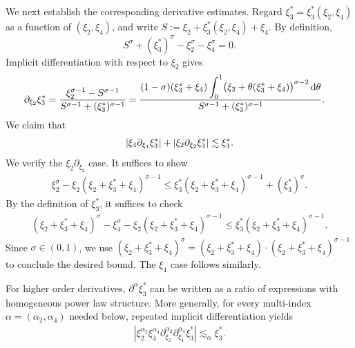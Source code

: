\documentclass[UTF-8,reqno]{amsart}
\numberwithin{equation}{section}
\theoremstyle{definition}
\def\dif{{\mathord{{\rm d}}}}
\def\leq{\leqslant}
\def\dif{{\mathord{{\rm d}}}}
\def\leq{\leqslant}
\begin{document}
We next establish the corresponding derivative estimates. Regard $ 
    \xi_3^*=\xi_3^*(\xi_2,\xi_4)$
as a function of $(\xi_2,\xi_4)$, and write
$
    S:=\xi_2+\xi_3^*(\xi_2,\xi_4)+\xi_4.
$
By definition,
\[
    S^\sigma+(\xi_3^*)^\sigma
    -\xi_2^\sigma-\xi_4^\sigma=0.
\]
Implicit differentiation with respect to $\xi_2$ gives
\begin{align}
\partial_{\xi_2}\xi_3^*
&=
\frac{
\xi_2^{\sigma-1}
-
S^{\sigma-1}
}{
S^{\sigma-1}
+
(\xi_3^*)^{\sigma-1}
} =
\frac{
(1-\sigma)(\xi_3^*+\xi_4)
\displaystyle\int_0^1
\bigl(
\xi_2+\theta(\xi_3^*+\xi_4)
\bigr)^{\sigma-2}
\,\dif\theta
}{
S^{\sigma-1}
+
(\xi_3^*)^{\sigma-1}
}.
\label{eq:derivative-xi3star}
\end{align} 
We claim that
\begin{align}
|\xi_4\partial_{\xi_4}\xi_3^*|+|\xi_2\partial_{\xi_2}\xi_3^*|\lesssim \xi_3^*  . \notag
\end{align} We verify the $\xi_2\partial_{\xi_2}$ case. It suffices to show
\begin{align*}
    \xi_2^{\sigma}-  \xi_2(\xi_2+\xi_3^*+\xi_4)^{\sigma-1}\leq  \xi_3^*(\xi_2+\xi_3^*+\xi_4)^{\sigma-1}+(\xi_3^*)^{\sigma}.
\end{align*}
By the definition of $\xi_3^*$, it suffices to check
\begin{align*}
    (\xi_2+\xi_3^*+\xi_4)^\sigma-\xi_4^\sigma-  \xi_2(\xi_2+\xi_3^*+\xi_4)^{\sigma-1}\leq  \xi_3^*(\xi_2+\xi_3^*+\xi_4)^{\sigma-1}.
\end{align*}
Since $\sigma\in(0,1)$,    we use  $(\xi_2+\xi_3^*+\xi_4)^\sigma=(\xi_2+\xi_3^*+\xi_4)\cdot (\xi_2+\xi_3^*+\xi_4)^{\sigma-1}$ to conclude the desired bound. The $\xi_4$ case follows similarly. 

For higher order derivatives, $\partial^\alpha \xi_3^*$ can be written as a ratio of expressions with homogeneous  power law structure.
More generally, for every multi-index
$\alpha=(\alpha_2,\alpha_4)$ needed below, repeated implicit
differentiation yields
\begin{align}
\left|
\xi_2^{\alpha_2}
\xi_4^{\alpha_4}
\partial_{\xi_2}^{\alpha_2}
\partial_{\xi_4}^{\alpha_4}
\xi_3^*
\right|
\lesssim_\alpha
\xi_3^*.
\label{bd:part2xi3}
\end{align}  
\end{document}
